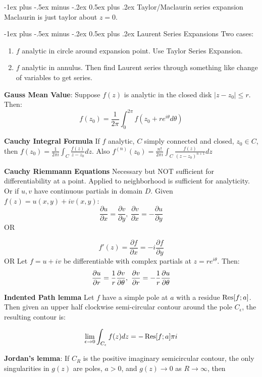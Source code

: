 \documentclass{article}
\makeatletter
\theoremstyle{definition}
\renewcommand{\section}{\@startsection{section}{1}{0mm}%
	{-1ex plus -.5ex minus -.2ex}%
	{0.5ex plus .2ex}%
	{\normalfont\large\bfseries}}
\makeatother
\begin{document}
\begin{multicols}{3}
\section{Taylor/Maclaurin series expansion}
Maclaurin is just taylor about $z=0$.

\section{Laurent Series Expansions}
Two cases:
\begin{enumerate}
	\item $f$ analytic in circle around expansion point. Use Taylor Series Expansion.
	\item $f$ analytic in annulus. Then find Laurent series through something like change of variables to get series.
\end{enumerate}
\textbf{Gauss Mean Value}:
Suppose $f(z)$ is analytic in the closed disk $|z-z_0| \leq r$. Then:
$$f(z_0) = \frac{1}{2 \pi } \int_{0}^{2\pi} f(z_0 + r e^{i\theta} d\theta)$$

\textbf{Cauchy Integral Formula}
If $f$ analytic, $C$ simply connected and closed, $z_0 \in C$, then $f(z_0) = \frac{1}{2\pi i}\int_{C} \frac{f(z)}{z-z_0}dz$. Also $f^{(n)}(z_0) = \frac{n!}{2\pi i } \int_C \frac{f(z)}{(z-z_0)^{n+1}}dz$

\textbf{Cauchy Riemmann Equations} Necessary but NOT sufficient for differentiability at a point. Applied to neighborhood is sufficient for analyticity. Or if $u, v$ have continuous partials in domain $D$. 
Given $f(z) = u(x,y)+iv(x,y)$:
$$\frac{\partial u}{\partial x} = \frac{\partial v}{\partial y},\ \frac{\partial v}{\partial x} = -\frac{\partial u}{\partial y}$$
OR

$$f'(z) = \frac{\partial f}{\partial x} = -i \frac{\partial f}{\partial y}$$
OR 
Let $f=u+iv$ be differentiable with complex partials at $z=re^{i\theta}$. Then:
$$\pdv{u}{r} = \frac{1}{r} \pdv{v}{\theta},\ \pdv{v}{r} = -\frac{1}{r} \pdv{u}{\theta}$$


\textbf{Indented Path lemma}
Let $f$ have a simple pole at $a$ with a residue $\Res[f;a]$. Then given an upper half clockwise semi-circular contour around the pole $C_\epsilon$, the resulting contour is:

\begin{align}
\lim_{\epsilon\to0} \int_{C_\epsilon} f(z) dz = -\Res[f;a]\pi i
\end{align}

\textbf{Jordan's lemma}: If $C_R$ is the positive imaginary semicircular contour, the only singularities in $g(z)$ are poles, $a>0$, and $g(z) \to 0$ as $R \to \infty$, then 


\end{multicols}
\end{document}
